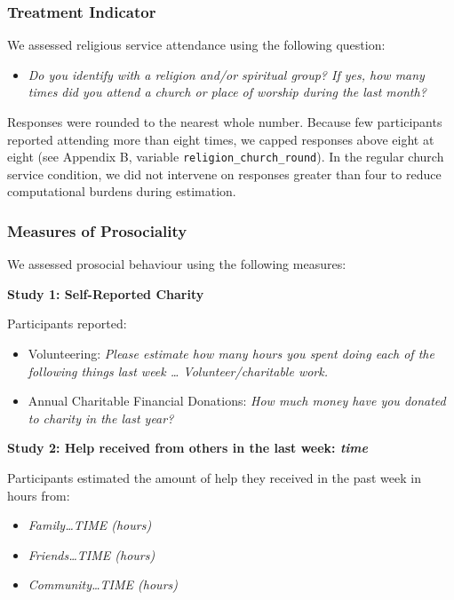 \documentclass[
  single column]{article}
\providecommand{\tightlist}{%
  \setlength{\itemsep}{0pt}\setlength{\parskip}{0pt}}\usepackage{longtable,booktabs,array}
\begin{document}
\subsubsection{Treatment Indicator}\label{treatment-indicator}

We assessed religious service attendance using the following question:

\begin{itemize}
\tightlist
\item
  \emph{Do you identify with a religion and/or spiritual group? If yes,
  how many times did you attend a church or place of worship during the
  last month?}
\end{itemize}

Responses were rounded to the nearest whole number. Because few
participants reported attending more than eight times, we capped
responses above eight at eight (see Appendix B, variable
\texttt{religion\_church\_round}). In the regular church service
condition, we did not intervene on responses greater than four to reduce
computational burdens during estimation.

\subsubsection{Measures of Prosociality}\label{measures-of-prosociality}

We assessed prosocial behaviour using the following measures:

\textbf{Study 1: Self-Reported Charity}

Participants reported:

\begin{itemize}
\item
  Volunteering: \emph{Please estimate how many hours you spent doing
  each of the following things last week \ldots{} Volunteer/charitable
  work.}
\item
  Annual Charitable Financial Donations: \emph{How much money have you
  donated to charity in the last year?}
\end{itemize}

\textbf{Study 2: Help received from others in the last week: \emph{time}
}

Participants estimated the amount of help they received in the past week
in hours from:

\begin{itemize}
\tightlist
\item
  \emph{Family\ldots TIME (hours)}
\item
  \emph{Friends\ldots TIME (hours)}
\item
  \emph{Community\ldots TIME (hours)}
\end{itemize}
\end{document}
